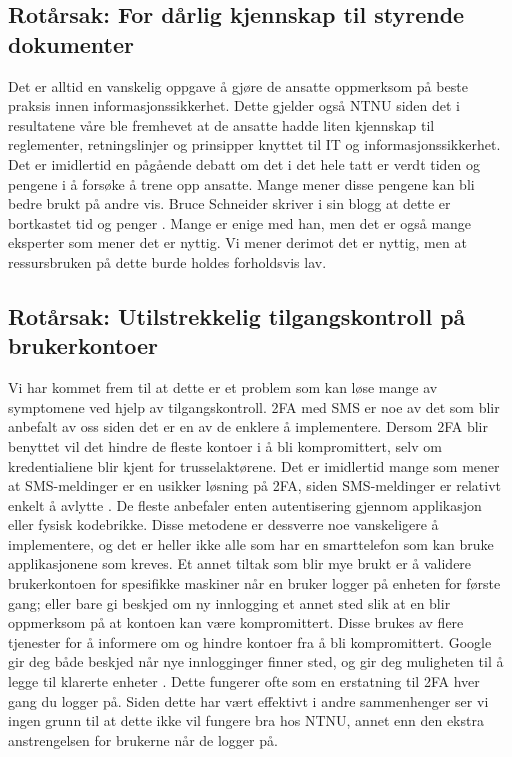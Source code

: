 \subsection*{Rotårsak: For dårlig kjennskap til styrende dokumenter}
Det er alltid en vanskelig oppgave å gjøre de ansatte oppmerksom på beste praksis innen informasjonssikkerhet. Dette gjelder også NTNU siden det i resultatene våre ble fremhevet at de ansatte hadde liten kjennskap til reglementer, retningslinjer og prinsipper knyttet til IT og informasjonssikkerhet. Det er imidlertid en pågående debatt om det i det hele tatt er verdt tiden og pengene i å forsøke å trene opp ansatte. Mange mener disse pengene kan bli bedre brukt på andre vis. Bruce Schneider skriver i sin blogg at dette er bortkastet tid og penger \cite{SecAware}. Mange er enige med han, men det er også mange eksperter som mener det er nyttig. Vi mener derimot det er nyttig, men at ressursbruken på dette burde holdes forholdsvis lav. 

\subsection*{Rotårsak: Utilstrekkelig tilgangskontroll på brukerkontoer}
Vi har kommet frem til at dette er et problem som kan løse mange av symptomene ved hjelp av tilgangskontroll. 2FA med SMS er noe av det som blir anbefalt av oss siden det er en av de enklere å implementere. Dersom 2FA blir benyttet vil det hindre de fleste kontoer i å bli kompromittert, selv om kredentialiene blir kjent for trusselaktørene. Det er imidlertid mange som mener at SMS-meldinger er en usikker løsning på 2FA, siden SMS-meldinger er relativt enkelt å avlytte \cite{2FA}. De fleste anbefaler enten autentisering gjennom applikasjon eller fysisk kodebrikke. Disse metodene er dessverre noe vanskeligere å implementere, og det er heller ikke alle som har en smarttelefon som kan bruke applikasjonene som kreves. Et annet tiltak som blir mye brukt er å validere brukerkontoen for spesifikke maskiner når en bruker logger på enheten for første gang; eller bare gi beskjed om ny innlogging et annet sted slik at en blir oppmerksom på at kontoen kan være kompromittert. Disse brukes av flere tjenester for å informere om og hindre kontoer fra å bli kompromittert. Google gir deg både beskjed når nye innlogginger finner sted, og gir deg muligheten til å legge til klarerte enheter \cite{trustcomp}. Dette fungerer ofte som en erstatning til 2FA hver gang du logger på. Siden dette har vært effektivt i andre sammenhenger ser vi ingen grunn til at dette ikke vil fungere bra hos NTNU, annet enn den ekstra anstrengelsen for brukerne når de logger på. 



